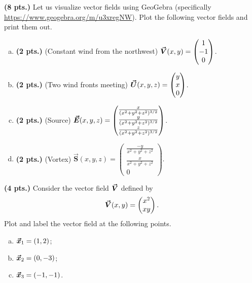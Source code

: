 \documentclass[12pt]{article} %
\begin{document}
\vspace*{0.5cm}

\begin{problem}
\textbf{(8 pts.)} Let us visualize vector fields using GeoGebra (specifically \url{https://www.geogebra.org/m/u3xregNW}). Plot the following vector fields and print them out.
\begin{enumerate}[(a)]
    \item \textbf{(2 pts.)} (Constant wind from the northwest) $\boldsymbol{\vec{V}}(x,y)=\begin{pmatrix} 1 \\ -1 \\ 0\end{pmatrix}$.
    \item \textbf{(2 pts.)} (Two wind fronts meeting) $\boldsymbol{\vec{U}}(x,y,z)=\begin{pmatrix} y \\ x \\ 0 \end{pmatrix}$.
    \item \textbf{(2 pts.)} (Source) $\boldsymbol{\vec{E}}(x,y,z) = \begin{pmatrix} \frac{x}{(x^2+y^2+z^2)^{3/2}} \\ \frac{y}{(x^2+y^2+z^2)^{3/2}} \\ \frac{z}{(x^2+y^2+z^2)^{3/2}} \end{pmatrix}$.
    \item \textbf{(2 pts.)} (Vortex) $\boldsymbol{\vec{S}}(x,y,z)=\begin{pmatrix} \frac{-y}{x^2+y^2+z^2} \\ \frac{x}{x^2+y^2+z^2} \\ 0\end{pmatrix}.$
\end{enumerate}
\end{problem}

\vspace*{0.5cm}

\begin{problem}
\textbf{(4 pts.)} Consider the vector field $\boldsymbol{\vec{V}}$ defined by
    \[
        \boldsymbol{\vec{V}}(x,y) = \begin{pmatrix} x^2 \\ xy \end{pmatrix}.
    \]
    Plot and label the vector field at the following points.
\begin{enumerate}[(a)]
    \item $\boldsymbol{\vec{x}}_1 = (1,2)$;
    \item $\boldsymbol{\vec{x}}_2 = (0,-3)$;
    \item $\boldsymbol{\vec{x}}_3 = (-1,-1)$.
\end{enumerate}
\end{problem}
\end{document}

